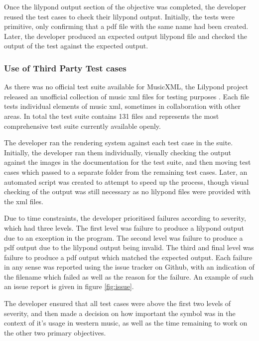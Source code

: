 Once the lilypond output section of the objective was completed, the developer reused the test cases to check their lilypond output. Initially, the tests were primitive, only confirming that a pdf file with the same name had been created. Later, the developer produced an expected output lilypond file and checked the output of the test against the expected output.

\subsubsection{Use of Third Party Test cases}
As there was no official test suite available for MusicXML, the Lilypond project released an unofficial collection of music xml files for testing purposes \parencite{LilypondTestcase}. Each file tests individual elements of music xml, sometimes in collaboration with other areas. In total the test suite contains 131 files and represents the most comprehensive test suite currently available openly.

The developer ran the rendering system against each test case in the suite. Initially, the developer ran them individually, visually checking the output against the images in the documentation for the test suite, and then moving test cases which passed to a separate folder from the remaining test cases. Later, an automated script was created to attempt to speed up the process, though visual checking of the output was still necessary as no lilypond files were provided with the xml files.

Due to time constraints, the developer prioritised failures according to severity, which had three levels. The first level was failure to produce a lilypond output due to an exception in the program. The second level was failure to produce a pdf output due to the lilypond output being invalid. The third and final level was failure to produce a pdf output which matched the expected output. Each failure in any sense was reported using the issue tracker on Github, with an indication of the filename which failed as well as the reason for the failure. An example of such an issue report is given in figure \ref{fig:issue}.

The developer ensured that all test cases were above the first two levels of severity, and then made a decision on how important the symbol was in the context of it's usage in western music, as well as the time remaining to work on the other two primary objectives.

